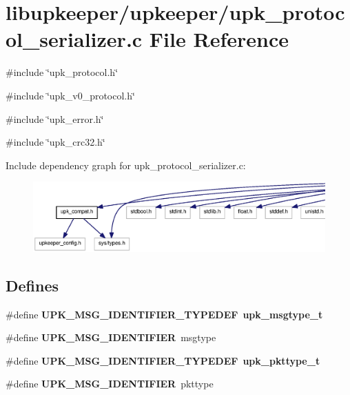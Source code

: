 \section{libupkeeper/upkeeper/upk\_\-protocol\_\-serializer.c File Reference}
\label{upk__protocol__serializer_8c}
{\ttfamily \#include \char`\"{}upk\_\-protocol.h\char`\"{}}\par
{\ttfamily \#include \char`\"{}upk\_\-v0\_\-protocol.h\char`\"{}}\par
{\ttfamily \#include \char`\"{}upk\_\-error.h\char`\"{}}\par
{\ttfamily \#include \char`\"{}upk\_\-crc32.h\char`\"{}}\par
Include dependency graph for upk\_\-protocol\_\-serializer.c:
\nopagebreak
\begin{figure}[H]
\begin{center}
\leavevmode
\includegraphics[width=400pt]{upk__protocol__serializer_8c__incl}
\end{center}
\end{figure}
\subsection*{Defines}
\begin{DoxyCompactItemize}
\item 
\#define {\bf UPK\_\-MSG\_\-IDENTIFIER\_\-TYPEDEF}~{\bf upk\_\-msgtype\_\-t}
\item 
\#define {\bf UPK\_\-MSG\_\-IDENTIFIER}~msgtype
\item 
\#define {\bf UPK\_\-MSG\_\-IDENTIFIER\_\-TYPEDEF}~{\bf upk\_\-pkttype\_\-t}
\item 
\#define {\bf UPK\_\-MSG\_\-IDENTIFIER}~pkttype
\end{DoxyCompactItemize}
